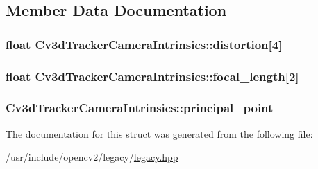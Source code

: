 \subsection{Member Data Documentation}
\hypertarget{structCv3dTrackerCameraIntrinsics_a7df407e5654176fd372d2cc951c5270a}{
\subsubsection[{distortion}]{\setlength{\rightskip}{0pt plus 5cm}float Cv3d\-Tracker\-Camera\-Intrinsics\-::distortion\mbox{[}4\mbox{]}}}\label{structCv3dTrackerCameraIntrinsics_a7df407e5654176fd372d2cc951c5270a}
\hypertarget{structCv3dTrackerCameraIntrinsics_a9996c0e6e05b81b97ed6182ba2a31206}{
\subsubsection[{focal\-\_\-length}]{\setlength{\rightskip}{0pt plus 5cm}float Cv3d\-Tracker\-Camera\-Intrinsics\-::focal\-\_\-length\mbox{[}2\mbox{]}}}\label{structCv3dTrackerCameraIntrinsics_a9996c0e6e05b81b97ed6182ba2a31206}
\hypertarget{structCv3dTrackerCameraIntrinsics_a31643cf1da19093b320317ba4339a09a}{
\subsubsection[{principal\-\_\-point}]{ Cv3d\-Tracker\-Camera\-Intrinsics\-::principal\-\_\-point}}\label{structCv3dTrackerCameraIntrinsics_a31643cf1da19093b320317ba4339a09a}


The documentation for this struct was generated from the following file\-:\begin{DoxyCompactItemize}
\item 
/usr/include/opencv2/legacy/\hyperlink{legacy_8hpp}{legacy.\-hpp}\end{DoxyCompactItemize}
